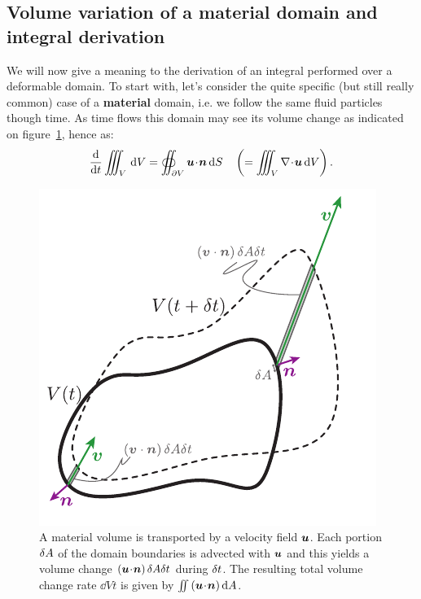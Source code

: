 \subsection{Volume variation of a material domain and integral derivation}
We will now give a meaning to the derivation of an integral performed over a deformable domain. To start with, let's consider the quite specific (but still really common) case of a \textbf{material} domain, i.e. we follow the same fluid particles though time. As time flows this domain may see its volume change as indicated on figure~\ref{fig:volume_change}, hence as:
\begin{equation}
\dd{}{t}\iiint_{V}\, \dV = \oiint_{\partial V} \bu\!\cdot\!\bn\,\dS \quad \lp = \iiint_V \nabla \!\cdot\! \bu \, \dV\rp.
\end{equation}
\begin{figure}[htbp]
\begin{center}
\includegraphics{./pics/volume_change.pdf}
\caption{A material volume is transported by a velocity field $\bu$. Each portion $\delta A$ of the domain boundaries is advected with $\bu$ and this yields a volume change $\lp\bu\!\cdot\!\bn\rp\delA\delt$ during $\delta t$. The resulting total volume change rate $\dd{V}{t}$ is given by $\iint \lp\bu\!\cdot\!\bn\rp \dA$.}
\label{fig:volume_change}
\end{center}
\end{figure}

